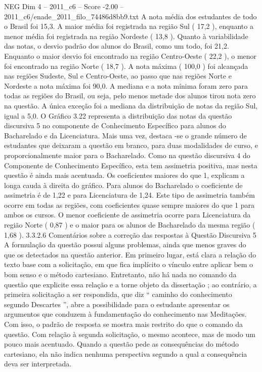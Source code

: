 \begin{textsample}{NEG Dim 4 – 2011\_c6 – Score -2.00 – 2011\_c6/enade\_2011\_filo\_74486d8bb9.txt}
A nota média dos estudantes de todo o Brasil foi 15,3.
A maior média foi registrada na região Sul ( 17,2 ), enquanto a menor média foi registrada na região Nordeste ( 13,8 ).
Quanto à variabilidade das notas, o desvio padrão dos alunos do Brasil, como um todo, foi 21,2.
Enquanto o maior desvio foi encontrado na região Centro-Oeste ( 22,2 ), o menor foi encontrado na região Norte ( 18,7 ).
A nota máxima ( 100,0 ) foi alcançada nas regiões Sudeste, Sul e Centro-Oeste, ao passo que nas regiões Norte e Nordeste a nota máxima foi 90,0.
A mediana e a nota mínima foram zero para todas as regiões do Brasil, ou seja, pelo menos metade dos alunos tirou nota zero na questão.
A única exceção foi a mediana da distribuição de notas da região Sul, igual a 5,0.
O Gráfico 3.22 representa a distribuição das notas da questão discursiva 5 no componente de Conhecimento Específico para alunos do Bacharelado e da Licenciatura.
Mais uma vez, destaca -se o grande número de estudantes que deixaram a questão em branco, para duas modalidades de curso, e proporcionalmente maior para o Bacharelado.
Como na questão discursiva 4 do Componente de Conhecimento Específico, esta tem assimetria positiva, mas nesta questão é ainda mais acentuada.
Os coeficientes maiores do que 1, explicam a longa cauda à direita do gráfico.
Para alunos do Bacharelado o coeficiente de assimetria é de 1,22 e para Licenciatura de 1,24.
Este tipo de assimetria também ocorre em todas as regiões, com coeficientes quase sempre maiores do que 1 para ambos os cursos.
O menor coeficiente de assimetria ocorre para Licenciatura da região Norte ( 0,87 ) e o maior para os alunos de Bacharelado da mesma região ( 1,68 ). 3.3.2.6 Comentários sobre a correção das respostas à Questão Discursiva 5 A formulação da questão possui alguns problemas, ainda que menos graves do que os detectados na questão anterior.
Em primeiro lugar, está clara a relação do texto base com a solicitação, em que fica implícito o vínculo entre aplicar bem o bom senso e o método cartesiano.
Entretanto, não há nada no comando da questão que explicite essa relação e a torne objeto da dissertação ; ao contrário, a primeira solicitação a ser respondida, que diz “ caminho do conhecimento segundo Descartes ”, abre a possibilidade para o estudante apresentar os argumentos que conduzem à fundamentação do conhecimento nas Meditações.
Com isso, o padrão de resposta se mostra mais restrito do que o comando da questão.
Com relação à segunda solicitação, o mesmo acontece, mas de modo um pouco mais acentuado.
Quando a questão pede as consequências do método cartesiano, ela não indica nenhuma perspectiva segundo a qual a consequência deva ser interpretada.

\end{textsample}
